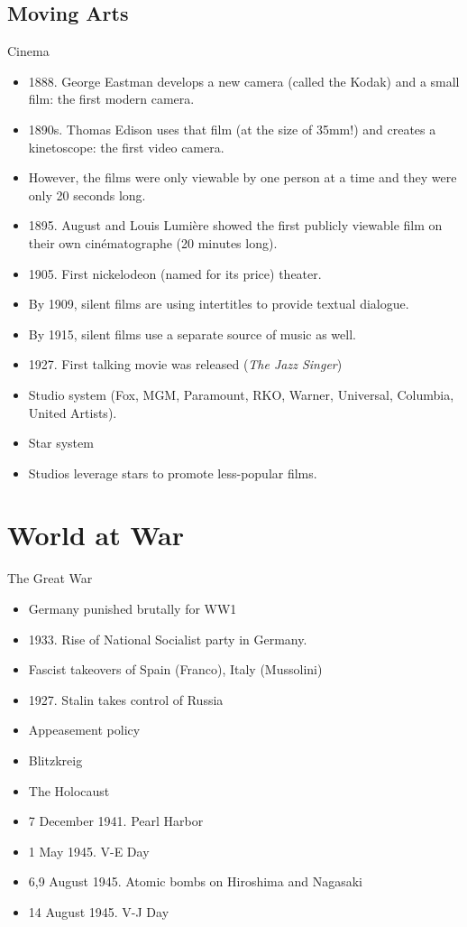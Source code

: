 \subsection{Moving Arts}
\begin{frame}{Cinema}
	\begin{itemize}
		\item<+->1888. George Eastman develops a new camera (called the Kodak) and a small film: the first modern camera.
		\item<+->1890s. Thomas Edison uses that film (at the size of 35mm!) and creates a kinetoscope: the first video camera.
		\item<+->However, the films were only viewable by one person at a time and they were only 20 seconds long.
		\item<+->1895. August and Louis Lumi{\`e}re showed the first publicly viewable film on their own cin{\'e}matographe (20 minutes long).
		\item<+->1905. First nickelodeon (named for its price) theater.
		\item<+->By 1909, silent films are using intertitles to provide textual dialogue.
		\item<+->By 1915, silent films use a separate source of music as well.
		\item<+->1927. First talking movie was released (\emph{The Jazz Singer})
		\item<+->Studio system (Fox, MGM, Paramount, RKO, Warner, Universal, Columbia, United Artists).
		\item<+->Star system
		\item<+->Studios leverage stars to promote less-popular films.
	\end{itemize}
\end{frame}

\section{World at War}
\begin{frame}{The Great War}
	
	\begin{itemize}
		\item<+->Germany punished brutally for WW1
		\item<+->1933. Rise of National Socialist party in Germany.
		\item<+->Fascist takeovers of Spain (Franco), Italy (Mussolini)
		\item<+->1927. Stalin takes control of Russia
		\item<+->Appeasement policy
		\item<+->Blitzkreig
		\item<+->The Holocaust
		\item<+->7 December 1941. Pearl Harbor
		\item<+->1 May 1945. V-E Day
		\item<+->6,9 August 1945. Atomic bombs on Hiroshima and Nagasaki
		\item<+->14 August 1945. V-J Day
	\end{itemize}
\end{frame}


